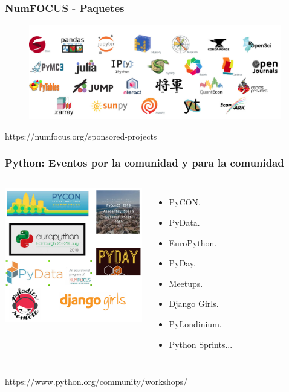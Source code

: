 \documentclass[18pt]{beamer}
\begin{document}
\begin{frame}

	\frametitle{NumFOCUS - Paquetes}
		
	\begin{figure}
		\includegraphics[width=11cm]{images/numfocus_packages.png}
	\end{figure}

	\vspace{0.6cm}    
	\centerline{https://numfocus.org/sponsored-projects}
	
\end{frame}

\begin{frame}

	\frametitle{Python: Eventos por la comunidad y para la comunidad}
	\begin{columns}
		\centering
			\includegraphics[width=6cm]{images/events.png}\\
			
		\begin{itemize}
			\setlength\itemsep{0.6em}		
			\item PyCON.
			\item PyData.
			\item EuroPython.
			\item PyDay.
			\item Meetups.
			\item Django Girls.
			\item PyLondinium.
			\item Python Sprints...

		\end{itemize}
	\end{columns}
	
	\vspace{0.4cm}
	\centerline{\large https://www.python.org/community/workshops/}
	
\end{frame}
\end{document}
